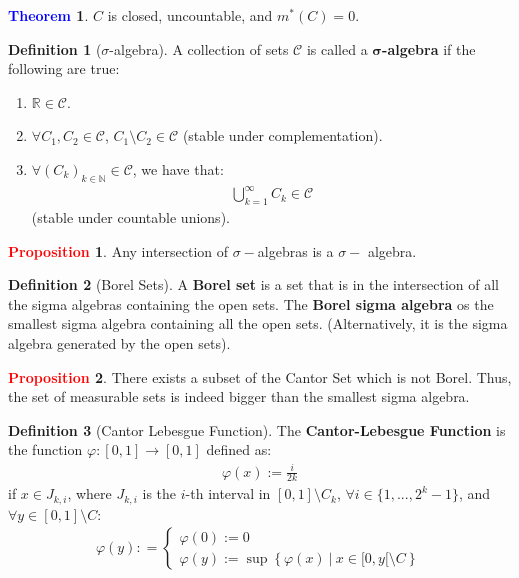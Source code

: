 \documentclass[reqno,11pt]{amsart}
\theoremstyle{definition}
\newcommand{\bb}[1]{\mathbb{#1}}
\newcommand{\sets}[2]{ \left\{ #1\ |\ #2 \right\}}
\newtheorem{theorem}{\textcolor{blue}{Theorem}}
\theoremstyle{definition}
\newtheorem{definition}{\textcolor{OliveGreen}{Definition}}
\newtheorem{prop}{\textcolor{red}{Proposition}}
\theoremstyle{remark}
\begin{document}
\begin{theorem}
	$C$ is closed, uncountable, and $m^*(C) = 0$. 
\end{theorem}

\begin{definition}[$\sigma$-algebra]
	A collection of sets $\mathcal{C}$ is called a $\mathbf{\sigma}$\textbf{-algebra} if the following are true: 
	\begin{enumerate}[nolistsep]
		\item $\bb{R} \in \mathcal{C}$. 
		\item $\forall C_1, C_2 \in \mathcal{C}$, $C_1 \setminus C_2 \in \mathcal{C}$ (stable under complementation). 
		\item $\forall (C_k)_{k \in \bb{N}} \in \mathcal{C}$, we have that: 
		\begin{align*}
			\bigcup_{k=1}^\infty C_k \in \mathcal{C} 	
		\end{align*}
		(stable under countable unions). 
	\end{enumerate}
\end{definition}

\begin{prop}
	Any intersection of $\sigma-$algebras is a $\sigma-$ algebra. 
\end{prop}

\begin{definition}[Borel Sets]
	A \textbf{Borel set} is a set that is in the intersection of all the sigma algebras containing the open sets. The \textbf{Borel sigma algebra} os the smallest sigma algebra containing all the open sets. (Alternatively, it is the sigma algebra generated by the open sets). 
\end{definition}

\begin{prop}
	There exists a subset of the Cantor Set which is not Borel. Thus, the set of measurable sets is indeed bigger than the smallest sigma algebra. 
\end{prop}

\begin{definition}[Cantor Lebesgue Function]
	The \textbf{Cantor-Lebesgue Function} is the function $\varphi: [0,1] \rightarrow [0,1]$ defined as: 
	\begin{align}
		\varphi(x) := \frac{i}{2k}
	\end{align}
	if $x \in J_{k,i}$, where $J_{k,i}$ is the $i$-th interval in $[0,1] \setminus C_k$, $\forall i \in \{ 1,..., 2^k -1 \}$, and $\forall y \in [0,1] \setminus C$: 
	\begin{align}
		\varphi(y) : = \begin{cases}
				\varphi(0) := 0 \\
				\varphi(y) := \sup \sets{\varphi(x)}{x \in [0,y[ \setminus C}
		\end{cases}
	\end{align}
\end{definition}
\end{document}
